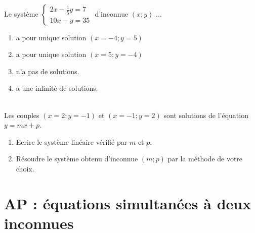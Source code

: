 \documentclass[main.tex]{subfiles}
\begin{document}
\vfill 
\vfill 
\begin{exercise} \hfill \\
Le système  $\begin{cases}
		2x-\frac{1}{5}y=7 \\10x-y=35 
	\end{cases}$ d'inconnue $(x;y)$ ... 
	\begin{enumerate}[leftmargin =*,label={\ding{109}}] 
		\item a pour unique solution $(x=-4;y=5)$
		\item a pour unique solution $(x=5;y=-4)$
		\item n'a pas de solutions.
		\item a une infinité de solutions.
	\end{enumerate} 
\end{exercise} 
\begin{exercise}  \hfill \\
Les couples $(x=2;y=-1)$ et $(x=-1;y=2)$ sont solutions de l'équation $y=mx+p$.
	\begin{enumerate}[leftmargin =*,label={\alph*)}] 
		\item Ecrire le système linéaire vérifié par $m$ et $p$.
		\item Résoudre le système obtenu d'inconnue $(m;p)$ par la méthode de votre choix.
	\end{enumerate} 
\end{exercise} 
\vfill 
	
	

\newpage 
{}  
\pagestyle{scrheadings} %
\onehalfspacing
\section{AP  : équations simultanées à deux inconnues}
\end{document}
